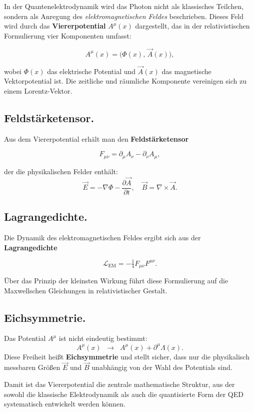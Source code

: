 In der Quantenelektrodynamik wird das Photon nicht als klassisches Teilchen,
sondern als Anregung des \emph{elektromagnetischen Feldes} beschrieben. 
Dieses Feld wird durch das \textbf{Viererpotential} \( A^\mu(x) \) dargestellt,
das in der relativistischen Formulierung vier Komponenten umfasst:

\[
A^\mu(x) = \big( \Phi(x), \, \vec{A}(x) \big) ,
\]

wobei \( \Phi(x) \) das elektrische Potential und \( \vec{A}(x) \) das magnetische Vektorpotential ist. 
Die zeitliche und räumliche Komponente vereinigen sich zu einem Lorentz-Vektor.

\subsection*{Feldstärketensor.}
Aus dem Viererpotential erhält man den \textbf{Feldstärketensor}

\[
F_{\mu\nu} = \partial_\mu A_\nu - \partial_\nu A_\mu ,
\]

der die physikalischen Felder enthält:
\[
\vec{E} = -\nabla \Phi - \frac{\partial \vec{A}}{\partial t}, 
\quad
\vec{B} = \nabla \times \vec{A}.
\]

\subsection*{Lagrangedichte.}
Die Dynamik des elektromagnetischen Feldes ergibt sich aus der
\textbf{Lagrangedichte}

\[
\mathcal{L}_{\text{EM}} = - \tfrac{1}{4} F_{\mu\nu} F^{\mu\nu} .
\]

Über das Prinzip der kleinsten Wirkung führt diese Formulierung auf die 
Maxwellschen Gleichungen in relativistischer Gestalt.

\subsection*{Eichsymmetrie.}
Das Potential \( A^\mu \) ist nicht eindeutig bestimmt:
\[
A^\mu(x) \;\;\rightarrow\;\; A^\mu(x) + \partial^\mu \Lambda(x).
\]
Diese Freiheit heißt \textbf{Eichsymmetrie} und stellt sicher, dass nur
die physikalisch messbaren Größen \( \vec{E} \) und \( \vec{B} \) 
unabhängig von der Wahl des Potentials sind.

\medskip
Damit ist das Viererpotential die zentrale mathematische Struktur, aus der
sowohl die klassische Elektrodynamik als auch die quantisierte Form der QED
systematisch entwickelt werden können.
